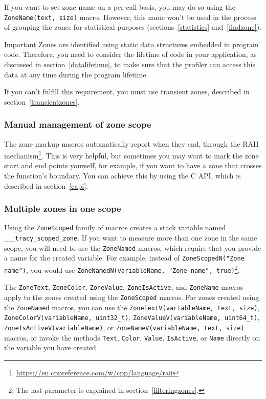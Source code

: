 \documentclass[hidelinks,titlepage,a4paper]{article}
\begin{document}
If you want to set zone name on a per-call basis, you may do so using the \texttt{ZoneName(text, size)} macro. However, this name won't be used in the process of grouping the zones for statistical purposes (sections~\ref{statistics} and~\ref{findzone}).

\begin{bclogo}[
noborder=true,
couleur=black!5,
logo=\bcbombe
]{Important}
Zones are identified using static data structures embedded in program code. Therefore, you need to consider the lifetime of code in your application, as discussed in section~\ref{datalifetime}, to make sure that the profiler can access this data at any time during the program lifetime.

If you can't fulfill this requirement, you must use transient zones, described in section~\ref{transientzones}.
\end{bclogo}

\subsubsection{Manual management of zone scope}

The zone markup macros automatically report when they end, through the RAII mechanism\footnote{\url{https://en.cppreference.com/w/cpp/language/raii}}. This is very helpful, but sometimes you may want to mark the zone start and end points yourself, for example, if you want to have a zone that crosses the function's boundary. You can achieve this by using the C API, which is described in section~\ref{capi}.

\subsubsection{Multiple zones in one scope}
\label{multizone}

Using the \texttt{ZoneScoped} family of macros creates a stack variable named \texttt{\_\_\_tracy\_scoped\_zone}. If you want to measure more than one zone in the same scope, you will need to use the \texttt{ZoneNamed} macros, which require that you provide a name for the created variable. For example, instead of \texttt{ZoneScopedN("Zone name")}, you would use \texttt{ZoneNamedN(variableName, "Zone name", true)}\footnote{The last parameter is explained in section~\ref{filteringzones}.}.

The \texttt{ZoneText}, \texttt{ZoneColor}, \texttt{ZoneValue}, \texttt{ZoneIsActive}, and \texttt{ZoneName} macros apply to the zones created using the \texttt{ZoneScoped} macros. For zones created using the \texttt{ZoneNamed} macros, you can use the \texttt{ZoneTextV(variableName, text, size)}, \texttt{ZoneColorV(variableName, uint32\_t)}, \texttt{ZoneValueV(variableName, uint64\_t)}, \texttt{ZoneIsActiveV(variableName)}, or \texttt{ZoneNameV(variableName, text, size)} macros, or invoke the methods \texttt{Text}, \texttt{Color}, \texttt{Value}, \texttt{IsActive}, or \texttt{Name} directly on the variable you have created.
\end{document}
